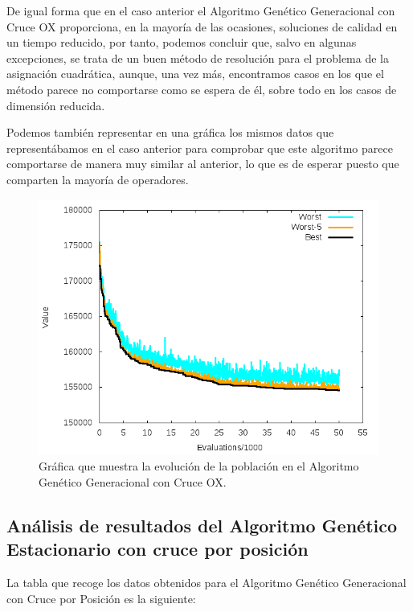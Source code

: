 \documentclass[11pt,a4paper]{article}
\begin{document}
	\noindent De igual forma que en el caso anterior el Algoritmo Genético Generacional con Cruce OX proporciona, en la mayoría de las ocasiones, soluciones de calidad en un tiempo reducido, por tanto, podemos concluir que, salvo en algunas excepciones, se trata de un buen método de resolución para el problema de la asignación cuadrática, aunque, una vez más, encontramos casos en los que el método parece no comportarse como se espera de él, sobre todo en los casos de dimensión reducida.
	
	\noindent Podemos también representar en una gráfica los mismos datos que representábamos en el caso anterior para comprobar que este algoritmo parece comportarse de manera muy similar al anterior, lo que es de esperar puesto que comparten la mayoría de operadores.
	
	\begin{figure}[!h]
		\centering
		\includegraphics[scale=0.4]{Plots/AGGOX.png} 
		\caption{Gráfica que muestra la evolución de la población en el Algoritmo Genético Generacional con Cruce OX.} \label{fig:figura3}
	\end{figure} 
	
	\FloatBarrier
	
	\subsection{Análisis de resultados del Algoritmo Genético Estacionario con cruce por posición}
	
	\noindent La tabla que recoge los datos obtenidos para el Algoritmo Genético Generacional con Cruce por Posición es la siguiente:\\
	
\end{document}
